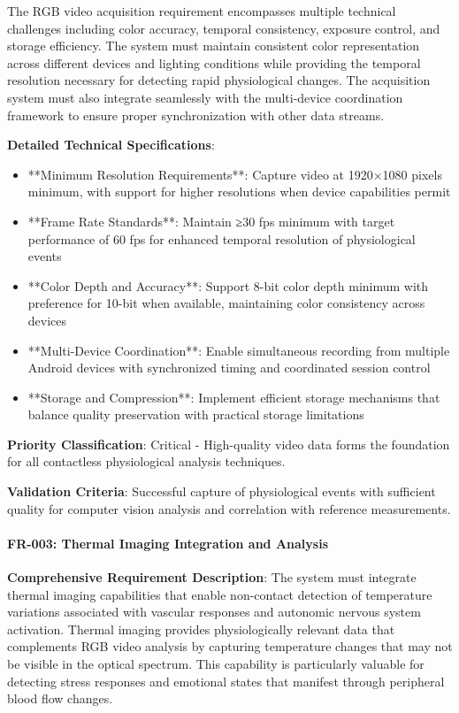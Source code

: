 \documentclass[12pt,a4paper]{report}
\begin{document}
The RGB video acquisition requirement encompasses multiple technical challenges including color accuracy, temporal
consistency, exposure control, and storage efficiency. The system must maintain consistent color representation across
different devices and lighting conditions while providing the temporal resolution necessary for detecting rapid
physiological changes. The acquisition system must also integrate seamlessly with the multi-device coordination
framework to ensure proper synchronization with other data streams.

\textbf{Detailed Technical Specifications}:

\begin{itemize}
\item **Minimum Resolution Requirements**: Capture video at 1920×1080 pixels minimum, with support for higher resolutions
  when device capabilities permit
\item **Frame Rate Standards**: Maintain ≥30 fps minimum with target performance of 60 fps for enhanced temporal resolution
  of physiological events
\item **Color Depth and Accuracy**: Support 8-bit color depth minimum with preference for 10-bit when available, maintaining
  color consistency across devices
\item **Multi-Device Coordination**: Enable simultaneous recording from multiple Android devices with synchronized timing
  and coordinated session control
\item **Storage and Compression**: Implement efficient storage mechanisms that balance quality preservation with practical
  storage limitations

\end{itemize}
\textbf{Priority Classification}: Critical - High-quality video data forms the foundation for all contactless physiological
analysis techniques.

\textbf{Validation Criteria}: Successful capture of physiological events with sufficient quality for computer vision analysis
and correlation with reference measurements.

\paragraph{FR-003: Thermal Imaging Integration and Analysis}

\textbf{Comprehensive Requirement Description}: The system must integrate thermal imaging capabilities that enable
non-contact detection of temperature variations associated with vascular responses and autonomic nervous system
activation. Thermal imaging provides physiologically relevant data that complements RGB video analysis by capturing
temperature changes that may not be visible in the optical spectrum. This capability is particularly valuable for
detecting stress responses and emotional states that manifest through peripheral blood flow changes.
\end{document}
